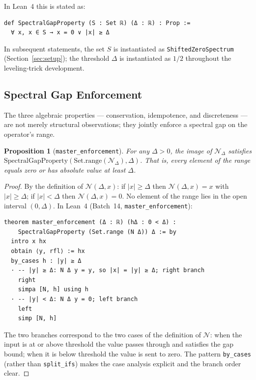 \documentclass[12pt, a4paper]{article}
\theoremstyle{plain}
\newtheorem{proposition}[theorem]{Proposition}
\theoremstyle{definition}
\newcommand{\N}{\mathcal{N}}
\newcommand{\lean}[1]{\texttt{#1}}
\begin{document}
In Lean~4 this is stated as:

\begin{lstlisting}[language=Lean4]
def SpectralGapProperty (S : Set ℝ) (Δ : ℝ) : Prop :=
  ∀ x, x ∈ S → x = 0 ∨ |x| ≥ Δ
\end{lstlisting}

In subsequent statements, the set $S$ is instantiated as
\lean{ShiftedZeroSpectrum} (Section~\ref{sec:setup}); the threshold
$\Delta$ is instantiated as $1/2$ throughout the leveling-trick development.

\subsection{Spectral Gap Enforcement}
\label{sec:gap_enforcement}

The three algebraic properties — conservation, idempotence, and discreteness
— are not merely structural observations; they jointly enforce a spectral gap
on the operator's range.

\begin{proposition}[\lean{master\_enforcement}]
\label{prop:enforcement}
For any $\Delta > 0$, the image of $\N_\Delta$ satisfies
$\mathrm{SpectralGapProperty}(\mathrm{Set.range}(\N_\Delta), \Delta)$.
That is, every element of the range equals zero or has absolute value at
least $\Delta$.
\end{proposition}

\begin{proof}
By the definition of $\N(\Delta, x)$: if $|x| \geq \Delta$ then
$\N(\Delta, x) = x$ with $|x| \geq \Delta$; if $|x| < \Delta$ then
$\N(\Delta, x) = 0$.
No element of the range lies in the open interval $(0, \Delta)$.
In Lean~4 (Batch~14, \lean{master\_enforcement}):
\begin{lstlisting}[language=Lean4]
theorem master_enforcement (Δ : ℝ) (hΔ : 0 < Δ) :
    SpectralGapProperty (Set.range (N Δ)) Δ := by
  intro x hx
  obtain ⟨y, rfl⟩ := hx
  by_cases h : |y| ≥ Δ
  · -- |y| ≥ Δ: N Δ y = y, so |x| = |y| ≥ Δ; right branch
    right
    simpa [N, h] using h
  · -- |y| < Δ: N Δ y = 0; left branch
    left
    simp [N, h]
\end{lstlisting}
The two branches correspond to the two cases of the definition of $\N$:
when the input is at or above threshold the value passes through and
satisfies the gap bound; when it is below threshold the value is sent
to zero. The pattern \lean{by\_cases} (rather than \lean{split\_ifs})
makes the case analysis explicit and the branch order clear.
\end{proof}
\end{document}

